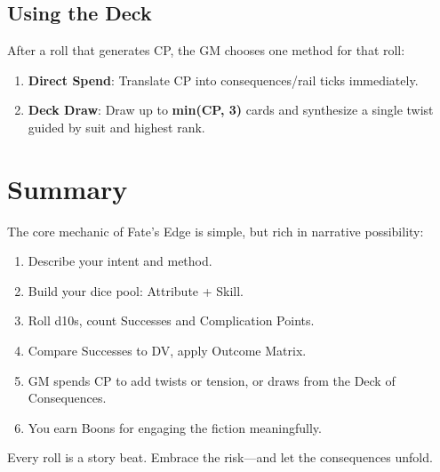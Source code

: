 \subsection*{Using the Deck}

After a roll that generates CP, the GM chooses one method for that roll:
\begin{enumerate}
  \item \textbf{Direct Spend}: Translate CP into consequences/rail ticks immediately.
  \item \textbf{Deck Draw}: Draw up to \textbf{min(CP, 3)} cards and synthesize a single twist guided by suit and highest rank.
\end{enumerate}

\section{Summary}

The core mechanic of Fate's Edge is simple, but rich in narrative possibility:

\begin{enumerate}
  \item Describe your intent and method.
  \item Build your dice pool: Attribute + Skill.
  \item Roll d10s, count Successes and Complication Points.
  \item Compare Successes to DV, apply Outcome Matrix.
  \item GM spends CP to add twists or tension, or draws from the Deck of Consequences.
  \item You earn Boons for engaging the fiction meaningfully.
\end{enumerate}

Every roll is a story beat. Embrace the risk—and let the consequences unfold.

